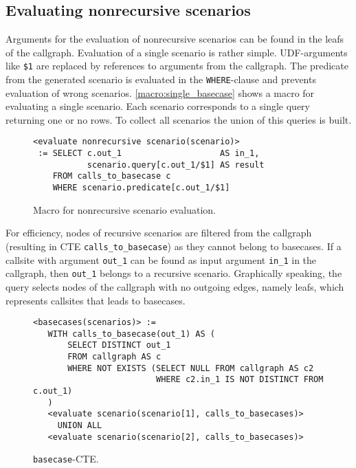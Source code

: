 \subsection{Evaluating nonrecursive scenarios}
Arguments for the evaluation of nonrecursive scenarios can be found in the leafs of the callgraph.
Evaluation of a single scenario is rather simple. UDF-arguments like \texttt{\$1} are replaced by references to arguments from the callgraph. The predicate from the generated scenario is evaluated in the \texttt{WHERE}-clause and prevents evaluation of wrong scenarios. \autoref{macro:single_basecase} shows a macro for evaluating a single scenario. Each scenario corresponds to a single query returning one or no rows. To collect all scenarios the union of this queries is built.
\begin{figure}[h!]
    \centering
    \begin{verbatim}
<evaluate nonrecursive scenario(scenario)>
 := SELECT c.out_1                    AS in_1, 
           scenario.query[c.out_1/$1] AS result
    FROM calls_to_basecase c
    WHERE scenario.predicate[c.out_1/$1]
    \end{verbatim}
    \caption{Macro for nonrecursive scenario evaluation.}
    \label{macro:single_basecase}
\end{figure}

For efficiency, nodes of recursive scenarios are filtered from the callgraph (resulting in CTE \texttt{calls\_to\_basecase}) as they cannot belong to basecases. If a callsite with argument \texttt{out\_1} can be found as input argument \texttt{in\_1} in the callgraph, then \texttt{out\_1} belongs to a recursive scenario. Graphically speaking, the query selects nodes of the callgraph with no outgoing edges, namely leafs, which represents callsites that leads to basecases.

\begin{figure}[h!]
    \centering
    \begin{verbatim}
<basecases(scenarios)> := 
   WITH calls_to_basecase(out_1) AS (
       SELECT DISTINCT out_1 
       FROM callgraph AS c
       WHERE NOT EXISTS (SELECT NULL FROM callgraph AS c2
                         WHERE c2.in_1 IS NOT DISTINCT FROM c.out_1)
   )
   <evaluate scenario(scenario[1], calls_to_basecases)>
     UNION ALL 
   <evaluate scenario(scenario[2], calls_to_basecases)>
    \end{verbatim}
    \caption{\texttt{basecase}-CTE.}
    \label{macro:basecases}
\end{figure}

